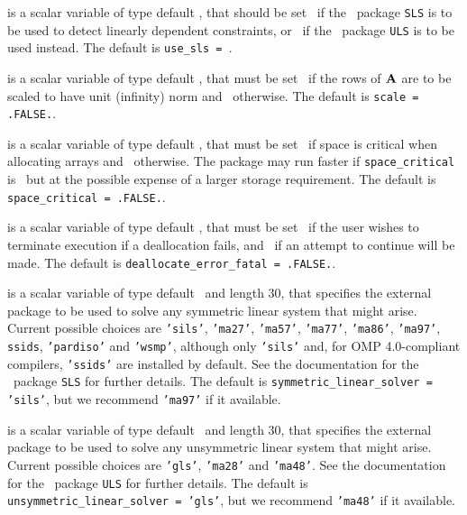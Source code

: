 \documentclass{galahad}
\newcommand{\packagename}{FDC}
\newcommand{\fullpackagename}{\libraryname\_\-\packagename}
\begin{document}
\begin{description}

 is a scalar variable of type default
\logical, that should be set \true\ if the
\libraryname\ package {\tt SLS} is to be used
to detect linearly dependent constraints, or \false\ if
the \libraryname\ package {\tt ULS} is to be used instead.
The default is {\tt use\_sls = }\false.

 is a scalar variable of type default \logical,
that must be set \true\ if the rows of ${\mathbf{A}}$ are to be scaled to
have unit (infinity) norm and  \false\ otherwise.
The default is {\tt scale = .FALSE.}.

 is a scalar variable of type default \logical,
that must be set \true\ if space is critical when allocating arrays
and  \false\ otherwise. The package may run faster if
{\tt space\_critical} is \false\ but at the possible expense of a larger
storage requirement. The default is {\tt space\_critical = .FALSE.}.

 is a scalar variable of type default \logical,
that must be set \true\ if the user wishes to terminate execution if
a deallocation  fails, and \false\ if an attempt to continue
will be made. The default is {\tt deallocate\_error\_fatal = .FALSE.}.

 is a scalar variable of type default 
\character\ and length 30, that specifies the external package to be used to
solve any symmetric linear system that might arise. Current possible
choices are {\tt 'sils'}, {\tt 'ma27'}, {\tt 'ma57'}, {\tt 'ma77'},
{\tt 'ma86'}, {\tt 'ma97'}, {\tt ssids}, {\tt 'pardiso'}
and {\tt 'wsmp'},
although only {\tt 'sils'} and, for OMP 4.0-compliant compilers,
{\tt 'ssids'} are installed by default.
See the documentation for the \galahad\ package {\tt SLS} for further details.
The default is {\tt symmetric\_linear\_solver = 'sils'},
but we recommend {\tt 'ma97'} if it available.

 is a scalar variable of type default 
\character\ and length 30, that specifies the external package to be used to
solve any unsymmetric linear system that might arise. Current possible
choices are {\tt 'gls'}, {\tt 'ma28'} and {\tt 'ma48'}.
See the documentation for the \galahad\ package {\tt ULS} for further details.
The default is {\tt unsymmetric\_linear\_solver = 'gls'},
but we recommend {\tt 'ma48'} if it available.


\end{description}
\end{document}
